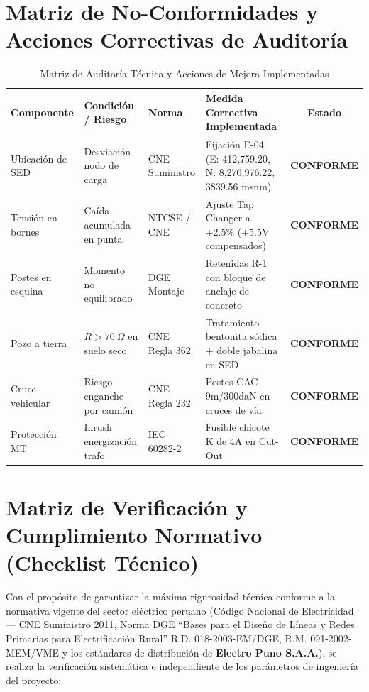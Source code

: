 \documentclass[12pt,a4paper]{report}
\begin{document}
\section{Matriz de No-Conformidades y Acciones Correctivas de Auditoría}
\begin{table}[H]
\centering
\caption{Matriz de Auditoría Técnica y Acciones de Mejora Implementadas}
\label{tab:matriz_auditoria}
\scriptsize
\begin{tabularx}{\linewidth}{L L l L c}
\toprule
\textbf{Componente} & \textbf{Condición / Riesgo} & \textbf{Norma} & \textbf{Medida Correctiva Implementada} & \textbf{Estado} \\
\midrule
Ubicación de SED & Desviación nodo de carga & CNE Suministro & Fijación E-04 (E: 412,759.20, N: 8,270,976.22, 3839.56 msnm) & \textbf{CONFORME} \\
Tensión en bornes & Caída acumulada en punta & NTCSE / CNE & Ajuste Tap Changer a +2.5\% (+5.5V compensados) & \textbf{CONFORME} \\
Postes en esquina & Momento no equilibrado & DGE Montaje & Retenidas R-1 con bloque de anclaje de concreto & \textbf{CONFORME} \\
Pozo a tierra & $R > 70\ \Omega$ en suelo seco & CNE Regla 362 & Tratamiento bentonita sódica + doble jabalina en SED & \textbf{CONFORME} \\
Cruce vehicular & Riesgo enganche por camión & CNE Regla 232 & Postes CAC 9m/300daN en cruces de vía & \textbf{CONFORME} \\
Protección MT & Inrush energización trafo & IEC 60282-2 & Fusible chicote K de 4A en Cut-Out & \textbf{CONFORME} \\
\bottomrule
\end{tabularx}
\end{table}

\section{Matriz de Verificación y Cumplimiento Normativo (Checklist Técnico)}
Con el propósito de garantizar la máxima rigurosidad técnica conforme a la normativa vigente del sector eléctrico peruano (Código Nacional de Electricidad --- CNE Suministro 2011, Norma DGE ``Bases para el Diseño de Líneas y Redes Primarias para Electrificación Rural'' R.D. 018-2003-EM/DGE, R.M. 091-2002-MEM/VME y los estándares de distribución de \textbf{Electro Puno S.A.A.}), se realiza la verificación sistemática e independiente de los parámetros de ingeniería del proyecto:
\end{document}

